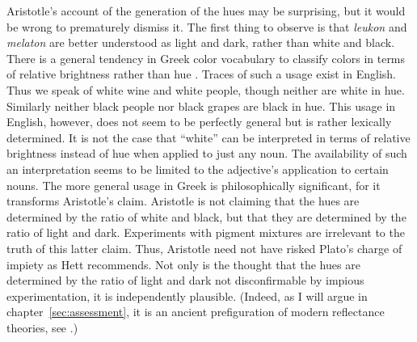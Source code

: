 Aristotle's account of the generation of the hues may be surprising, but it would be wrong to prematurely dismiss it. The first thing to observe is that \emph{leukon} and \emph{melaton} are better understood as light and dark, rather than white and black. There is a general tendency in Greek color vocabulary to classify colors in terms of relative brightness rather than hue \citep[see][]{Gladstone:1858fk,Platnauer:1921bh,Osbourne:1968vn,Lloyd:2007fk}. Traces of such a usage exist in English. Thus we speak of white wine and white people, though neither are white in hue. Similarly neither black people nor black grapes are black in hue. This usage in English, however, does not seem to be perfectly general but is rather lexically determined. It is not the case that ``white'' can be interpreted in terms of relative brightness instead of hue when applied to just any noun. The availability of such an interpretation seems to be limited to the adjective's application to certain nouns. The more general usage in Greek is philosophically significant, for it transforms Aristotle's claim. Aristotle is not claiming that the hues are determined by the ratio of white and black, but that they are determined by the ratio of light and dark. Experiments with pigment mixtures are irrelevant to the truth of this latter claim. Thus, Aristotle need not have risked Plato's charge of impiety as Hett recommends. Not only is the thought that the hues are determined by the ratio of light and dark not disconfirmable by impious experimentation, it is independently plausible. (Indeed, as I will argue in chapter~\ref{sec:assessment}, it is an ancient prefiguration of modern reflectance theories, see \citealt{Hilbert:1987jq}.)

